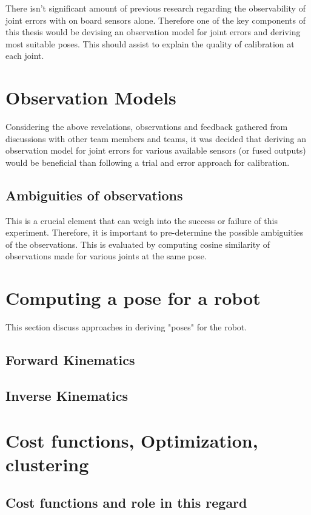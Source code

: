 \documentclass[english, printversion, nomenclature, notitle]{tuvisionthesis} %
\begin{document}
There isn't significant amount of previous research regarding the observability of joint errors with on board sensors alone. Therefore one of the key components of this thesis would be devising an observation model for joint errors and deriving most suitable poses. This should assist to explain the quality of calibration at each joint.

\section{Observation Models}
Considering the above revelations, observations and feedback gathered from discussions with other team members and teams, it was decided that deriving an observation model for joint errors for various available sensors (or fused outputs) would be beneficial than following a trial and error approach for calibration.

\subsection{Ambiguities of observations}
This is a crucial element that can weigh into the success or failure of this experiment. Therefore, it is important to pre-determine the possible ambiguities of the observations. This is evaluated by computing cosine similarity of observations made for various joints at the same pose. 

\section{Computing a pose for a robot}
This section discuss approaches in deriving "poses" for the robot.
\subsection{Forward Kinematics}
\subsection{Inverse Kinematics}

\section{Cost functions, Optimization, clustering}
\subsection{Cost functions and role in this regard}
\end{document}
